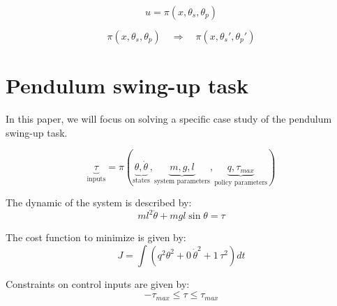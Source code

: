 \begin{equation}
u
=
\pi \left(
x,
\theta_s,
\theta_p
\right)
\end{equation}




\begin{equation}
\pi \left(
x,
\theta_s,
\theta_p
\right)
\quad \Rightarrow \quad
\pi \left(
x,
\theta_s',
\theta_p'
\right)
\end{equation}



\newpage
\section{Pendulum swing-up task}
In this paper, we will focus on solving a specific case study of the pendulum swing-up task. 

\begin{equation}
\underbrace{\tau}_{\text{inputs}}
=
\pi \left(
\underbrace{ \theta, \dot{\theta} }_{\text{states}},
\underbrace{ m , g , l }_{\text{system parameters}},
\underbrace{ q , \tau_{max} }_{\text{policy parameters}}
\right)
\end{equation}

The dynamic of the system is described by:
\begin{equation}
ml^2 \ddot{\theta} + mgl \sin \theta = \tau
\end{equation}

The cost function to minimize is given by:
\begin{equation}
J = \int{( q^2 \theta^2 + 0 \, \dot{\theta}^2 + 1 \, \tau^2 ) dt }
\end{equation}

Constraints on control inputs are given by:
\begin{equation}
- \tau_{max} \leq \tau \leq \tau_{max}
\end{equation}

